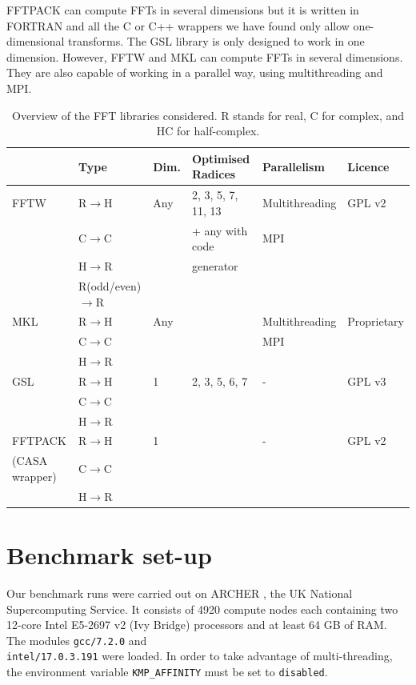 \documentclass[12pt, a4paper]{article} \setlength{\textheight}{24cm}
\begin{document}
FFTPACK can compute FFTs in several dimensions but it is written in
FORTRAN and all the C or C++ wrappers we have found only allow
one-dimensional transforms. The GSL library is only designed to work
in one dimension. However, FFTW and MKL can compute FFTs in several
dimensions. They are also capable of working in a parallel way, using
multithreading and MPI.
\begin{table}[H]
  \begin{tabular}{|l||l|l|l|l|l|}
    \hline
    & Type & Dim. & Optimised Radices & Parallelism & Licence \\
    \hline
    \hline
    FFTW & R$\to$H & Any & 2, 3, 5, 7, 11, 13  & Multithreading  & GPL v2\\
    & C$\to$C & & + any with code & MPI &  \\
    &  H$\to$R & &  generator & &  \\
    & R{\scriptsize (odd/even)}$\to$R & & & &  \\
    \hline
    MKL  &  R$\to$H & Any & & Multithreading & Proprietary\\
    & C$\to$C & & & MPI &  \\
    &  H$\to$R & & & &  \\
    \hline
    GSL  &  R$\to$H & 1 & 2, 3, 5, 6, 7 & - & GPL v3\\
    & C$\to$C & & & &  \\
    &  H$\to$R & & & &  \\
    \hline
    FFTPACK  &  R$\to$H  & 1 & & - & GPL v2\\
    {\scriptsize (CASA wrapper)} & C$\to$C & & & &  \\
    &  H$\to$R & & & &  \\
    \hline
  \end{tabular}
  \caption{Overview of the FFT libraries considered. R stands for real, C for complex, and HC for half-complex.}
  \label{ffttable}
\end{table}

\section{Benchmark set-up}
Our benchmark runs were carried out on ARCHER \cite{archer}, the UK
National Supercomputing Service.  It consists of 4920 compute nodes
each containing two 12-core Intel E5-2697 v2 (Ivy Bridge) processors
and at least 64 GB of RAM. The modules \texttt{gcc/7.2.0} and \\
\texttt{intel/17.0.3.191} were loaded. In order to take advantage of
multi-threading, the environment variable \texttt{KMP\_AFFINITY} must
be set to \texttt{disabled}.
\end{document}

